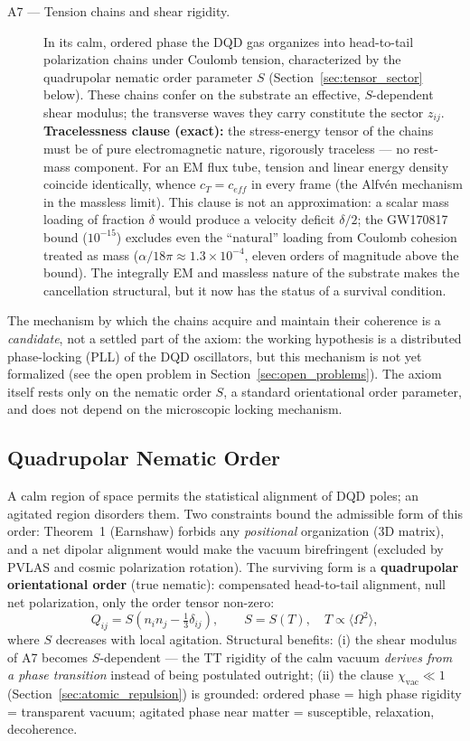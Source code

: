 \documentclass[11pt,a4paper]{article}
\theoremstyle{plain}
\theoremstyle{remark}
\begin{document}
\begin{description}
\item[A7 --- Tension chains and shear rigidity.] In its calm, ordered phase the DQD gas organizes into head-to-tail polarization chains under Coulomb tension, characterized by the quadrupolar nematic order parameter $S$ (Section~\ref{sec:tensor_sector} below). These chains confer on the substrate an effective, $S$-dependent shear modulus; the transverse waves they carry constitute the sector $z_{ij}$. \textbf{Tracelessness clause (exact):} the stress-energy tensor of the chains must be of pure electromagnetic nature, rigorously traceless --- no rest-mass component. For an EM flux tube, tension and linear energy density coincide identically, whence $c_T = c_{eff}$ in every frame (the Alfv\'en mechanism in the massless limit). This clause is not an approximation: a scalar mass loading of fraction $\delta$ would produce a velocity deficit $\delta/2$; the GW170817 bound ($10^{-15}$) excludes even the ``natural'' loading from Coulomb cohesion treated as mass ($\alpha/18\pi \approx 1.3\times10^{-4}$, eleven orders of magnitude above the bound). The integrally EM and massless nature of the substrate makes the cancellation structural, but it now has the status of a survival condition.
\end{description}

\noindent The mechanism by which the chains acquire and maintain their coherence is a \emph{candidate}, not a settled part of the axiom: the working hypothesis is a distributed phase-locking (PLL) of the DQD oscillators, but this mechanism is not yet formalized (see the open problem in Section~\ref{sec:open_problems}). The axiom itself rests only on the nematic order $S$, a standard orientational order parameter, and does not depend on the microscopic locking mechanism.

\subsection{Quadrupolar Nematic Order}
A calm region of space permits the statistical alignment of DQD poles; an agitated region disorders them. Two constraints bound the admissible form of this order: Theorem~1 (Earnshaw) forbids any \emph{positional} organization (3D matrix), and a net dipolar alignment would make the vacuum birefringent (excluded by PVLAS and cosmic polarization rotation). The surviving form is a \textbf{quadrupolar orientational order} (true nematic): compensated head-to-tail alignment, null net polarization, only the order tensor non-zero:
\begin{equation}
Q_{ij} = S\left(n_i n_j - \tfrac{1}{3}\delta_{ij}\right), \qquad S = S(T), \quad T \propto \langle\Omega^2\rangle,
\end{equation}
where $S$ decreases with local agitation. Structural benefits: (i) the shear modulus of A7 becomes $S$-dependent --- the TT rigidity of the calm vacuum \emph{derives from a phase transition} instead of being postulated outright; (ii) the clause $\chi_{\text{vac}} \ll 1$ (Section~\ref{sec:atomic_repulsion}) is grounded: ordered phase = high phase rigidity = transparent vacuum; agitated phase near matter = susceptible, relaxation, decoherence.
\end{document}
